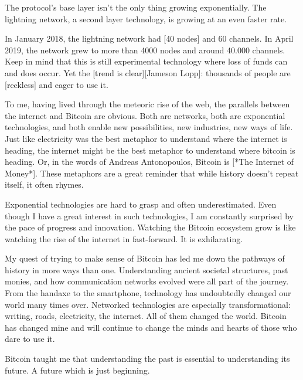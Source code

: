The protocol's base layer isn't the only thing growing exponentially.
The lightning network, a second layer technology, is growing at an even
faster rate.

In January 2018, the lightning network had [40 nodes] and 60 channels.
In April 2019, the network grew to more than 4000 nodes and around
40.000 channels. Keep in mind that this is still experimental technology
where loss of funds can and does occur. Yet the [trend is clear][Jameson Lopp]:
thousands of people are [reckless] and eager to use it.


To me, having lived through the meteoric rise of the web, the parallels
between the internet and Bitcoin are obvious. Both are networks, both
are exponential technologies, and both enable new possibilities, new
industries, new ways of life. Just like electricity was the best
metaphor to understand where the internet is heading, the internet might
be the best metaphor to understand where bitcoin is heading. Or, in the
words of Andreas Antonopoulos, Bitcoin is [*The Internet of Money*].
These metaphors are a great reminder that while history doesn't repeat
itself, it often rhymes.

Exponential technologies are hard to grasp and often underestimated.
Even though I have a great interest in such technologies, I am
constantly surprised by the pace of progress and innovation. Watching
the Bitcoin ecosystem grow is like watching the rise of the internet in
fast-forward. It is exhilarating.

My quest of trying to make sense of Bitcoin has led me down the pathways
of history in more ways than one. Understanding ancient societal
structures, past monies, and how communication networks evolved were all
part of the journey. From the handaxe to the smartphone, technology has
undoubtedly changed our world many times over. Networked technologies
are especially transformational: writing, roads, electricity, the
internet. All of them changed the world. Bitcoin has changed mine and
will continue to change the minds and hearts of those who dare to use
it.

Bitcoin taught me that understanding the past is essential to
understanding its future. A future which is just beginning.


